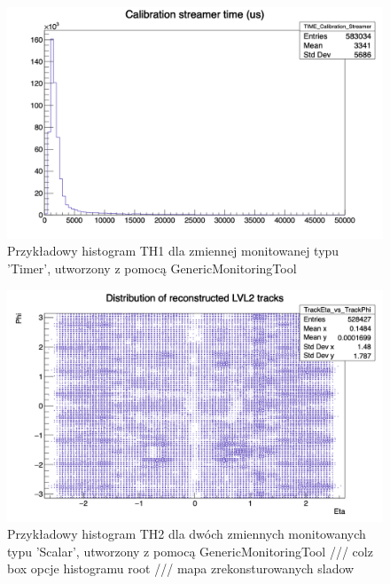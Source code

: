 \begin{figure}[!ht]
\centering
\includegraphics[width=1\textwidth]{img/histogram_TH1_time.png}
\caption{
Przykładowy histogram TH1 dla zmiennej monitowanej typu 'Timer', utworzony z pomocą GenericMonitoringTool 
}
\label{fig:athena:histogram_TH1_time}
\end{figure}

\begin{figure}[!ht]
\centering
\includegraphics[width=1\textwidth]{img/histogram_TH2.png}
\caption{
Przykładowy histogram TH2 dla dwóch zmiennych monitowanych typu 'Scalar', utworzony z pomocą GenericMonitoringTool /// colz box opcje histogramu root /// mapa zrekonsturowanych sladow
}
\label{fig:athena:histogram_TH2}
\end{figure}


